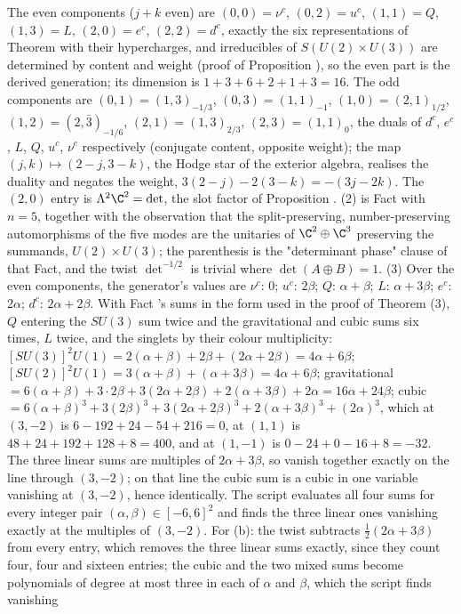 The even components ($j + k$ even) are $(0,0) = \nu^{c}$, $(0,2) = u^{c}$, $(1,1) = Q$, $(1,3) = L$, $(2,0) = e^{c}$, $(2,2) = d^{c}$, exactly the six representations of Theorem  with their hypercharges, and irreducibles of $S(U(2) \times U(3))$ are determined by content and weight (proof of Proposition ), so the even part is the derived generation; its dimension is $1 + 3 + 6 + 2 + 1 + 3 = 16$. The odd components are $(0,1) = (1,3)_{-1/3}$, $(0,3) = (1,1)_{-1}$, $(1,0) = (2,1)_{1/2}$, $(1,2) = (2,\bar{3})_{-1/6}$, $(2,1) = (1,3)_{2/3}$, $(2,3) = (1,1)_{0}$, the duals of $d^{c}$, $e^{c}$, $L$, $Q$, $u^{c}$, $\nu^{c}$ respectively (conjugate content, opposite weight); the map $(j, k) \mapsto (2 - j, 3 - k)$, the Hodge star of the exterior algebra, realises the duality and negates the weight, $3(2-j) - 2(3-k) = -(3j - 2k)$. The $(2,0)$ entry is $\Lambda^{2}\C^{2} = \det$, the slot factor of Proposition . (2) is Fact  with $n = 5$, together with the observation that the split-preserving, number-preserving automorphisms of the five modes are the unitaries of $\C^{2} \oplus \C^{3}$ preserving the summands, $U(2) \times U(3)$; the parenthesis is the "determinant phase" clause of that Fact, and the twist $\det^{-1/2}$ is trivial where $\det(A \oplus B) = 1$. (3) Over the even components, the generator's values are $\nu^{c}$: $0$; $u^{c}$: $2\beta$; $Q$: $\alpha + \beta$; $L$: $\alpha + 3\beta$; $e^{c}$: $2\alpha$; $d^{c}$: $2\alpha + 2\beta$. With Fact 's sums in the form used in the proof of Theorem (3), $Q$ entering the $SU(3)$ sum twice and the gravitational and cubic sums six times, $L$ twice, and the singlets by their colour multiplicity: $[SU(3)]^{2}U(1) = 2(\alpha + \beta) + 2\beta + (2\alpha + 2\beta) = 4\alpha + 6\beta$; $[SU(2)]^{2}U(1) = 3(\alpha + \beta) + (\alpha + 3\beta) = 4\alpha + 6\beta$; gravitational $= 6(\alpha + \beta) + 3 \cdot 2\beta + 3(2\alpha + 2\beta) + 2(\alpha + 3\beta) + 2\alpha = 16\alpha + 24\beta$; cubic $= 6(\alpha + \beta)^{3} + 3(2\beta)^{3} + 3(2\alpha + 2\beta)^{3} + 2(\alpha + 3\beta)^{3} + (2\alpha)^{3}$, which at $(3, -2)$ is $6 - 192 + 24 - 54 + 216 = 0$, at $(1, 1)$ is $48 + 24 + 192 + 128 + 8 = 400$, and at $(1, -1)$ is $0 - 24 + 0 - 16 + 8 = -32$. The three linear sums are multiples of $2\alpha + 3\beta$, so vanish together exactly on the line through $(3,-2)$; on that line the cubic sum is a cubic in one variable vanishing at $(3,-2)$, hence identically. The script evaluates all four sums for every integer pair $(\alpha, \beta) \in [-6, 6]^{2}$ and finds the three linear ones vanishing exactly at the multiples of $(3, -2)$. For (b): the twist subtracts $\tfrac12(2\alpha + 3\beta)$ from every entry, which removes the three linear sums exactly, since they count four, four and sixteen entries; the cubic and the two mixed sums become polynomials of degree at most three in each of $\alpha$ and $\beta$, which the script finds vanishing 